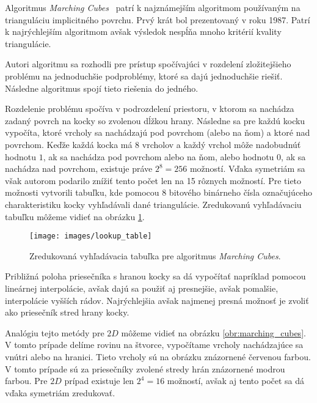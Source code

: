 Algoritmus \textit{Marching Cubes}~\cite{lorensen1987marching} patrí k najznámejším algoritmom používaným
na trianguláciu implicitného povrchu. Prvý krát bol prezentovaný v roku 1987. Patrí k najrýchlejším
algoritmom avšak výsledok nespĺňa mnoho kritérií kvality triangulácie. 

Autori algoritmu sa rozhodli pre prístup spočívajúci v rozdelení zložitejšieho problému na 
jednoduchšie podproblémy, ktoré sa dajú jednoduchšie riešiť. Následne algoritmus 
spojí tieto riešenia do jedného.

Rozdelenie problému spočíva v podrozdelení priestoru, v ktorom sa nachádza zadaný povrch na kocky 
so zvolenou dĺžkou hrany. 
Následne sa pre každú kocku vypočíta, ktoré vrcholy sa nachádzajú pod povrchom (alebo na ňom) 
a ktoré nad povrchom. Keďže každá kocka má 8 vrcholov a každý vrchol môže nadobudnúť hodnotu $1$, ak sa 
nachádza pod povrchom alebo na ňom, alebo hodnotu $0$, ak sa nachádza nad povrchom, existuje práve 
$2^8 = 256$ možností. Vďaka symetriám sa však autorom podarilo znížiť tento počet len na 15 rôznych možností.
Pre tieto možnosti vytvorili tabuľku, kde pomocou 8 bitového binárneho čísla označujúceho charakteristiku
kocky vyhľadávali dané triangulácie. Zredukovanú vyhľadávaciu tabuľku môžeme vidieť na obrázku \ref{obr:lookup_table}.

\begin{figure}
    \centerline{\texttt{[image: images/lookup\_table]}}
    \caption[Zredukovaná vyhľadávacia tabuľka pre algoritmus Marching Cubes]
    {Zredukovaná vyhľadávacia tabuľka \cite{smistad2012real} pre algoritmus \textit{Marching Cubes}.}
    \label{obr:lookup_table}
\end{figure}

Približná poloha priesečníka s hranou kocky sa dá vypočítať napríklad pomocou lineárnej interpolácie, avšak 
dajú sa použiť aj presnejšie, avšak pomalšie, interpolácie vyšších rádov. Najrýchlejšia avšak najmenej presná
možnosť je zvoliť ako priesečník stred hrany kocky.

Analógiu tejto metódy pre $2D$ môžeme vidieť na obrázku \ref{obr:marching_cubes}. V tomto prípade delíme rovinu na štvorce, 
vypočítame vrcholy nachádzajúce sa vnútri alebo na hranici. Tieto vrcholy sú na obrázku znázornené 
červenou farbou. V tomto prípade sú za priesečníky zvolené stredy hrán znázornené modrou farbou. 
Pre $2D$ prípad existuje len $2^4 = 16$ možností, avšak aj tento počet sa dá vďaka symetriám zredukovať.


